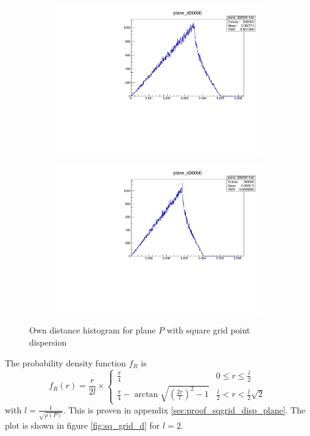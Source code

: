 \begin{figure}[H]
\centering
\begin{subfigure}{.5\textwidth}
\includegraphics[width=\linewidth]{fig/plane_d20000.pdf}
\end{subfigure}%
\begin{subfigure}{.5\textwidth}
\includegraphics[width=\linewidth]{fig/plane_d30000.pdf}
\end{subfigure}
\caption{Own distance histogram for plane $P$ with square grid point dispersion}
\label{fig:plane_cphist}
\end{figure}

The probability density function $f_R$ is
\begin{equation}
f_R(r) = \frac{r}{2 l} \times \begin{cases}
	\frac{\pi}{4} & 0 \leq r \leq \frac{l}{2} \\
	\frac{\pi}{4} - \arctan{\sqrt{\left( \frac{2r}{l} \right)^2 - 1}} & \frac{l}{2} < r < \frac{l}{2} \sqrt{2}
\end{cases}
\end{equation}
with $l = \frac{1}{\sqrt{\rho(P)}}$. This is proven in appendix \ref{sec:proof_sqgrid_disp_plane}. The plot is shown in figure \ref{fig:sq_grid_d} for $l = 2$.

